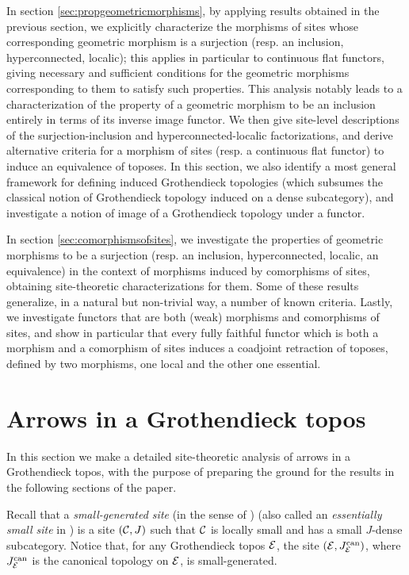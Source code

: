 \documentclass[a4paper,12pt]{article}
\begin{document}
In section \ref{sec:propgeometricmorphisms}, by applying results obtained in the previous section, we explicitly characterize the morphisms of sites whose corresponding geometric morphism is a surjection (resp. an inclusion, hyperconnected, localic); this applies in particular to continuous flat functors, giving necessary and sufficient conditions for the geometric morphisms corresponding to them to satisfy such properties. This analysis notably leads to a characterization of the property of a geometric morphism to be an inclusion entirely in terms of its inverse image functor. We then give site-level descriptions of the surjection-inclusion and hyperconnected-localic factorizations, and derive alternative criteria for a morphism of sites (resp. a continuous flat functor) to induce an equivalence of toposes. In this section, we also identify a most general framework for defining induced Grothendieck topologies (which subsumes the classical notion of Grothendieck topology induced on a dense subcategory), and investigate a notion of image of a Grothendieck topology under a functor. 

In section \ref{sec:comorphismsofsites}, we investigate the properties of geometric morphisms to be a surjection (resp. an inclusion, hyperconnected, localic, an equivalence) in the context of morphisms induced by comorphisms of sites, obtaining site-theoretic characterizations for them. Some of these results generalize, in a natural but non-trivial way, a number of known criteria. Lastly, we investigate functors that are both (weak) morphisms and comorphisms of sites, and show in particular that every fully faithful functor which is both a morphism and a comorphism of sites induces a coadjoint retraction of toposes, defined by two morphisms, one local and the other one essential. 
 
 
\section{Arrows in a Grothendieck topos}\label{sec:arrows}

In this section we make a detailed site-theoretic analysis of arrows in a Grothendieck topos, with the purpose of preparing the ground for the results in the following sections of the paper.

Recall that a \emph{small-generated site} (in the sense of \cite{Shulman}) (also called an \emph{essentially small site} in \cite{El}) is a site $({\cal C}, J)$ such that $\cal C$ is locally small and has a small $J$-dense subcategory. Notice that, for any Grothendieck topos $\cal E$, the site $({\cal E}, J_{\cal E}^{\textup{can}})$, where $J_{\cal E}^{\textup{can}}$ is the canonical topology on $\cal E$, is small-generated.
\end{document}
